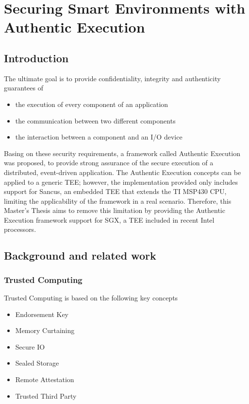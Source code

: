 \documentclass{article}
\begin{document}
\section{Securing Smart Environments with Authentic Execution}

\subsection{Introduction}

The ultimate goal is to provide confidentiality, integrity and authenticity guarantees of \begin{itemize}
\item the execution of every component of an application
\item the communication between two different components
\item the interaction between a component and an I/O device
\end{itemize} 
Basing on these security requirements, a framework called Authentic Execution was proposed, to provide strong assurance of the secure execution of a distributed, event-driven application. The Authentic Execution concepts can be applied to a generic TEE; however, the implementation provided only includes support for Sancus, an embedded TEE that extends the TI MSP430 CPU, limiting the applicability of the framework in a real scenario. Therefore, this Master’s Thesis aims to remove this limitation by providing the Authentic Execution framework support for SGX, a TEE included in recent Intel processors.

\subsection{Background and related work}

\subsubsection{Trusted Computing}

Trusted Computing is based on the following key concepts \begin{itemize}
\item Endorsement Key
\item Memory Curtaining
\item Secure IO
\item Sealed Storage
\item Remote Attestation
\item Trusted Third Party
\end{itemize}
\end{document}
